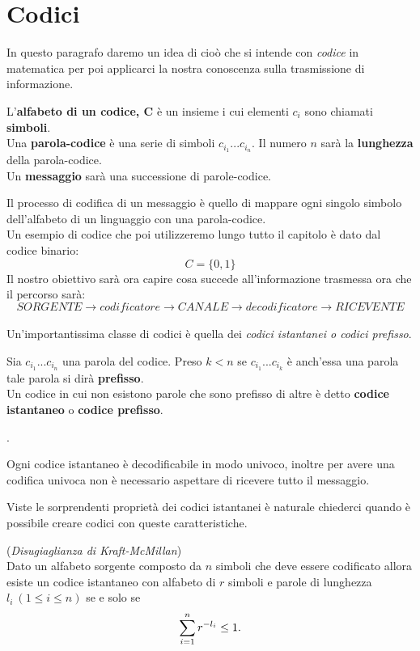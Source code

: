 \section{Codici}
\label{sec:Codici}
In questo paragrafo daremo un idea di cioò che si intende con \textit{codice} in matematica per poi applicarci la nostra conoscenza sulla trasmissione di informazione.\\
\begin{defi}
L'\textbf{alfabeto di un codice, C} è un insieme \acode i cui elementi $c_i$ sono chiamati \textbf{simboli}.\\
Una \textbf{parola-codice} è una serie di simboli $c_{i_1}...c_{i_n}$. Il numero $n$ sarà la \textbf{lunghezza} della parola-codice.\\
Un \textbf{messaggio} sarà una successione di parole-codice.
\end{defi}
Il processo di codifica di un messaggio è quello di mappare ogni singolo  simbolo dell'alfabeto di un linguaggio con una parola-codice.\\
Un esempio di codice che poi utilizzeremo lungo tutto il capitolo è dato dal codice binario:
$$C=\{0, 1 \}$$
Il nostro obiettivo sarà ora capire cosa succede all'informazione trasmessa ora che il percorso sarà:
$$ SORGENTE \to codificatore \to CANALE \to decodificatore \to RICEVENTE$$
\\
Un'importantissima classe di codici è quella dei \textit{codici istantanei o codici prefisso}.
\begin{defi}
Sia $c_{i_1}...c_{i_n}$ una parola del codice. Preso $k<n$ se  $c_{i_1}...c_{i_k}$
è anch'essa una parola tale parola si dirà \textbf{prefisso}.\\
Un codice in cui non esistono parole che sono prefisso di altre è detto \textbf{codice istantaneo} o \textbf{codice prefisso}.
\end{defi}.
\begin{lem}
Ogni codice istantaneo è decodificabile in modo univoco, inoltre per avere una codifica univoca non è necessario aspettare di ricevere tutto il messaggio.
\end{lem}

Viste le sorprendenti proprietà dei codici istantanei è naturale chiederci quando è possibile creare codici con queste caratteristiche.

\begin{teo} \label{teo:disugKM} (\textit{Disugiaglianza di Kraft-McMillan})\\
Dato un alfabeto sorgente composto da $n$ simboli che deve essere codificato allora esiste un codice istantaneo con alfabeto di $r$ simboli e parole di lunghezza $l_i \ (1 \leq i \leq n)$ se e solo se 
\begin{equation}
\sum_{i=1}^n r^{-l_i}\leq 1.
\end{equation} 
\end{teo}

